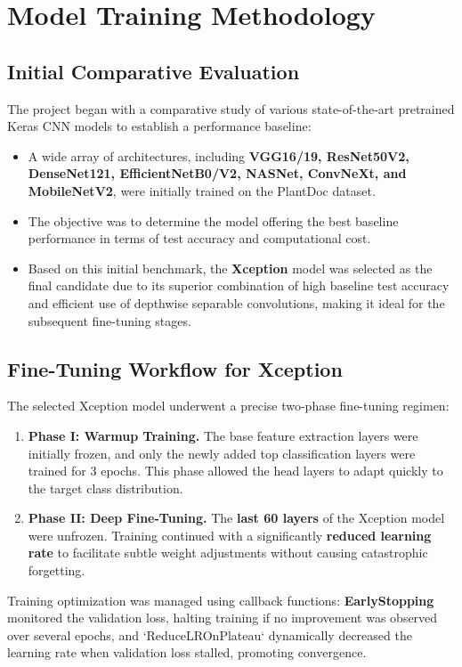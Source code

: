 \documentclass[12pt, a4paper]{report}
\begin{document}
\section{Model Training Methodology}
\label{sec:training_methodology}

\subsection*{Initial Comparative Evaluation} %
\noindent
The project began with a comparative study of various state-of-the-art pretrained Keras CNN models to establish a performance baseline:
\begin{itemize}
    \item A wide array of architectures, including \textbf{VGG16/19, ResNet50V2, DenseNet121, EfficientNetB0/V2, NASNet, ConvNeXt, and MobileNetV2}, were initially trained on the PlantDoc dataset.
    \item The objective was to determine the model offering the best baseline performance in terms of test accuracy and computational cost.
    \item Based on this initial benchmark, the \textbf{Xception} model was selected as the final candidate due to its superior combination of high baseline test accuracy and efficient use of depthwise separable convolutions, making it ideal for the subsequent fine-tuning stages.
\end{itemize}

\subsection*{Fine-Tuning Workflow for Xception} %
\noindent
The selected Xception model underwent a precise two-phase fine-tuning regimen:
\begin{enumerate}
    \item \textbf{Phase I: Warmup Training.} The base feature extraction layers were initially frozen, and only the newly added top classification layers were trained for 3 epochs. This phase allowed the head layers to adapt quickly to the target class distribution.
    \item \textbf{Phase II: Deep Fine-Tuning.} The \textbf{last 60 layers} of the Xception model were unfrozen. Training continued with a significantly \textbf{reduced learning rate} to facilitate subtle weight adjustments without causing catastrophic forgetting.
\end{enumerate}
\noindent %
Training optimization was managed using callback functions: \textbf{EarlyStopping} monitored the validation loss, halting training if no improvement was observed over several epochs, and `ReduceLROnPlateau` dynamically decreased the learning rate when validation loss stalled, promoting convergence.
\end{document}
